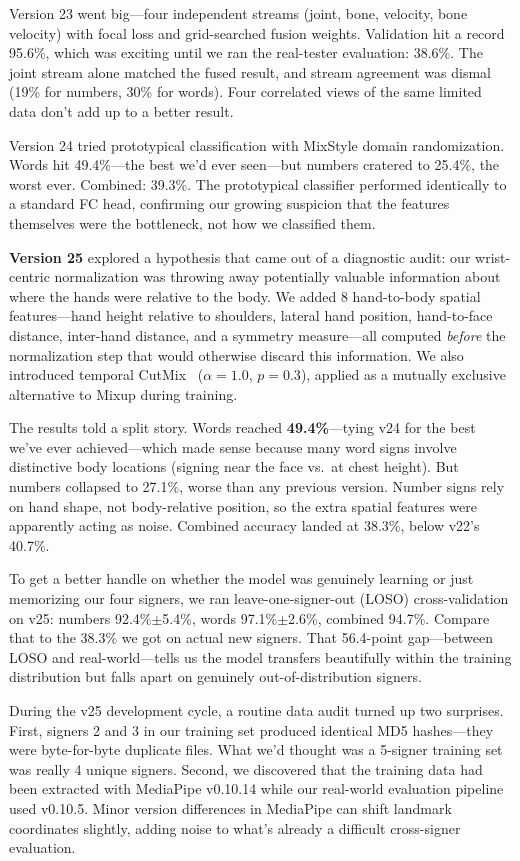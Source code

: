 \documentclass[conference]{IEEEtran}
\begin{document}
Version 23 went big---four independent streams (joint, bone, velocity, bone velocity) with focal loss and grid-searched fusion weights. Validation hit a record 95.6\%, which was exciting until we ran the real-tester evaluation: 38.6\%. The joint stream alone matched the fused result, and stream agreement was dismal (19\% for numbers, 30\% for words). Four correlated views of the same limited data don't add up to a better result.

Version 24 tried prototypical classification with MixStyle domain randomization. Words hit 49.4\%---the best we'd ever seen---but numbers cratered to 25.4\%, the worst ever. Combined: 39.3\%. The prototypical classifier performed identically to a standard FC head, confirming our growing suspicion that the features themselves were the bottleneck, not how we classified them.

\textbf{Version 25} explored a hypothesis that came out of a diagnostic audit: our wrist-centric normalization was throwing away potentially valuable information about where the hands were relative to the body. We added 8 hand-to-body spatial features---hand height relative to shoulders, lateral hand position, hand-to-face distance, inter-hand distance, and a symmetry measure---all computed \textit{before} the normalization step that would otherwise discard this information. We also introduced temporal CutMix~\cite{zhang2018mixup} ($\alpha=1.0$, $p=0.3$), applied as a mutually exclusive alternative to Mixup during training.

The results told a split story. Words reached \textbf{49.4\%}---tying v24 for the best we've ever achieved---which made sense because many word signs involve distinctive body locations (signing near the face vs.\ at chest height). But numbers collapsed to 27.1\%, worse than any previous version. Number signs rely on hand shape, not body-relative position, so the extra spatial features were apparently acting as noise. Combined accuracy landed at 38.3\%, below v22's 40.7\%.

To get a better handle on whether the model was genuinely learning or just memorizing our four signers, we ran leave-one-signer-out (LOSO) cross-validation on v25: numbers 92.4\%$\pm$5.4\%, words 97.1\%$\pm$2.6\%, combined 94.7\%. Compare that to the 38.3\% we got on actual new signers. That 56.4-point gap---between LOSO and real-world---tells us the model transfers beautifully within the training distribution but falls apart on genuinely out-of-distribution signers.

During the v25 development cycle, a routine data audit turned up two surprises. First, signers 2 and 3 in our training set produced identical MD5 hashes---they were byte-for-byte duplicate files. What we'd thought was a 5-signer training set was really 4 unique signers. Second, we discovered that the training data had been extracted with MediaPipe v0.10.14 while our real-world evaluation pipeline used v0.10.5. Minor version differences in MediaPipe can shift landmark coordinates slightly, adding noise to what's already a difficult cross-signer evaluation.
\end{document}
